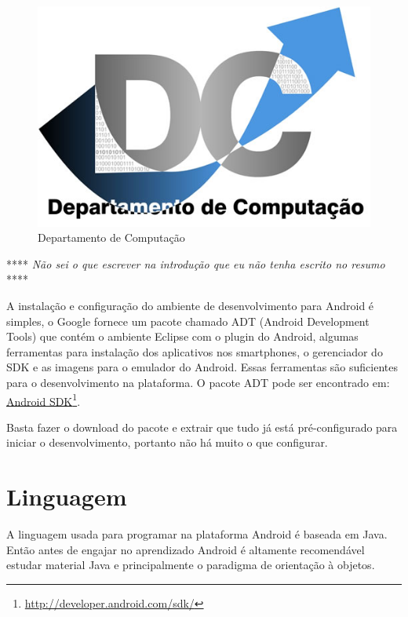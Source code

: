 \documentclass[a4paper,12pt,brazil,doubleside]{book}
\begin{document}
\clearpage %
\thispagestyle{empty}

\thispagestyle{empty}

\doublespace

\cleardoublepage

\pagestyle{body}


\begin{figure}[!htb]
  \centering
  \includegraphics[width=.5\textwidth]{../figuras/LogoDC.jpg}
  \caption{Departamento de Computação}
  \label{fig:dc}
\end{figure}

**** \emph{Não sei o que escrever na introdução que eu não tenha escrito no resumo} ****

A instalação e configuração do ambiente de desenvolvimento para Android é simples, o Google fornece um pacote chamado ADT (Android Development Tools) que contém o ambiente Eclipse com o plugin do Android, algumas ferramentas para instalação dos aplicativos nos smartphones, o gerenciador do SDK e as imagens para o emulador do Android. Essas ferramentas são suficientes para o desenvolvimento na plataforma.
O pacote ADT pode ser encontrado em: \href{http://developer.android.com/sdk/}{Android SDK}\footnote{\href{http://developer.android.com/sdk/}{http://developer.android.com/sdk/}}. 

Basta fazer o download do pacote e extrair que tudo já está pré-configurado para iniciar o desenvolvimento, portanto não há muito o que configurar.

\section{Linguagem}
A linguagem usada para programar na plataforma Android é baseada em Java. Então antes de engajar no aprendizado Android é altamente recomendável estudar material Java e principalmente o paradigma de orientação à objetos.
\end{document}
